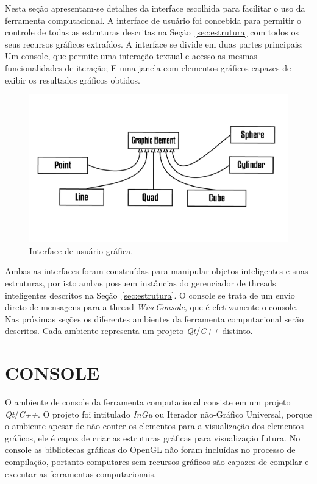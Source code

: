 \documentclass[a4paper,12pt]{monografia}
\theoremstyle{plain}
\theoremstyle{definition}
\theoremstyle{remark}
\begin{document}
Nesta seção apresentam-se detalhes da interface escolhida para facilitar o uso da ferramenta computacional. A interface de usuário foi concebida para permitir o controle de todas as estruturas descritas na Seção~\ref{sec:estrutura} com todos os seus recursos gráficos extraídos. A interface se divide em duas partes principais: Um console, que permite uma interação textual e acesso as mesmas funcionalidades de iteração; E uma janela com elementos gráficos capazes de exibir os resultados gráficos obtidos. 

\begin{figure}[!htbp]
	\centering
	\includegraphics[scale=1]{Figures/GraphicElements}
	\caption{Interface de usuário gráfica.}
	\label{fig10:UI}
\end{figure}

Ambas as interfaces foram construídas para manipular objetos inteligentes e suas estruturas, por isto ambas possuem instâncias do gerenciador de threads inteligentes descritos na Seção~\ref{sec:estrutura}. O console se trata de um envio direto de mensagens para a thread \textit{WiseConsole}, que é efetivamente o console. Nas próximas seções os diferentes ambientes da ferramenta computacional serão descritos. Cada ambiente representa um projeto \textit{Qt}/\textit{C++} distinto.

\section{CONSOLE}\label{sec:console}

O ambiente de console da ferramenta computacional consiste em um projeto \textit{Qt}/\textit{C++}. O projeto foi intitulado \textit{InGu} ou Iterador não-Gráfico Universal, porque o ambiente apesar de não conter os elementos para a visualização dos elementos gráficos, ele é capaz de criar as estruturas gráficas para visualização futura.  No console as bibliotecas gráficas do OpenGL não foram incluídas no processo de compilação, portanto computares sem recursos gráficos são capazes de compilar e executar as ferramentas computacionais.
\end{document}
